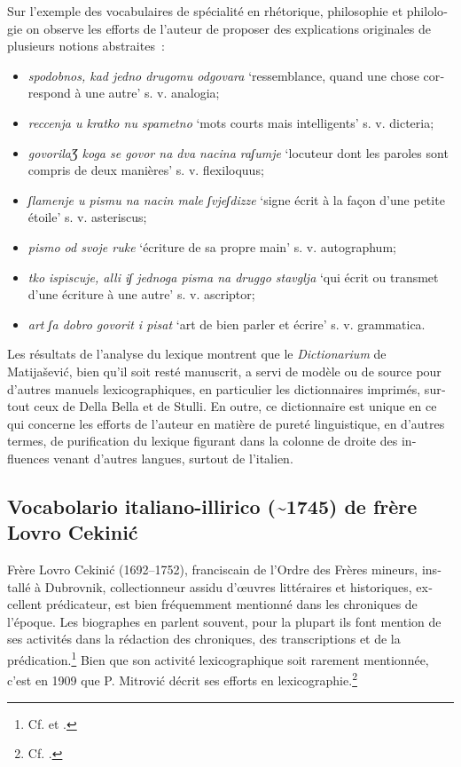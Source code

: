 \documentclass[output=paper,colorlinks,citecolor=brown,arabicfont,chinesefont,booklanguage=french]{langscibook}
\begin{document}
\begin{otherlanguage}{french}
\largerpage
Sur l’exemple des vocabulaires de spécialité en rhétorique, philosophie et philologie on observe les efforts de l’auteur de proposer des explications originales de plusieurs notions abstraites~: 

\begin{itemize}
    \item \emph{spodobnos, kad jedno drugomu odgovara} ‘ressemblance, quand une chose correspond à une autre’ s. v. analogia; 
    \item \emph{reccenja u kratko nu spametno} ‘mots courts mais intelligents’ s. v. dicteria; 
    \item \emph{govorilaƷ koga se govor na dva nacina raʃumje} ‘locuteur dont les paroles sont compris de deux manières’ s. v. flexiloquus;
    \item \emph{ʃlamenje u pismu na nacin male ʃvjeʃdizze} ‘signe écrit à la façon d’une petite étoile’ s. v. asteriscus; 
    \item \emph{pismo od svoje ruke} ‘écriture de sa propre main’ s. v. autographum; 
    \item \emph{tko ispiscuje, alli iʃ jednoga pisma na druggo stavglja} ‘qui écrit ou transmet d’une écriture à une autre’ s. v. ascriptor;
    \item \emph{art ʃa dobro govorit i pisat} ‘art de bien parler et écrire’ s. v. grammatica. 
\end{itemize}

Les résultats de l’analyse du lexique montrent que le \emph{Dictionarium} de Matijašević, bien qu’il soit resté manuscrit, a servi de modèle ou de source pour d’autres manuels lexicographiques, en particulier les dictionnaires imprimés, surtout ceux de Della Bella et de Stulli. En outre, ce dictionnaire est unique en ce qui concerne les efforts de l’auteur en matière de pureté linguistique, en d’autres termes, de purification du lexique figurant dans la colonne de droite des influences venant d’autres langues, surtout de l’italien.

\subsection{Vocabolario italiano-illirico (\~{}1745) de frère Lovro Cekinić}

Frère Lovro Cekinić (1692--1752), franciscain de l’Ordre des Frères mineurs, installé à Dubrovnik, collectionneur assidu d’œuvres littéraires et historiques, excellent prédicateur, est bien fréquemment mentionné dans les chroniques de l’époque. Les biographes en parlent souvent, pour la plupart ils font mention de ses activités dans la rédaction des chroniques, des transcriptions et de la prédication.\footnote{Cf. \citealt{Franic2007} et \citealt{Franic2008}.}  Bien que son activité lexicographique soit rarement mentionnée, c’est en 1909 que P. Mitrović décrit ses efforts en lexicographie.\footnote{Cf. \citealt[528--533]{Mitrovic1909}.  }


\end{otherlanguage}
\end{document}
